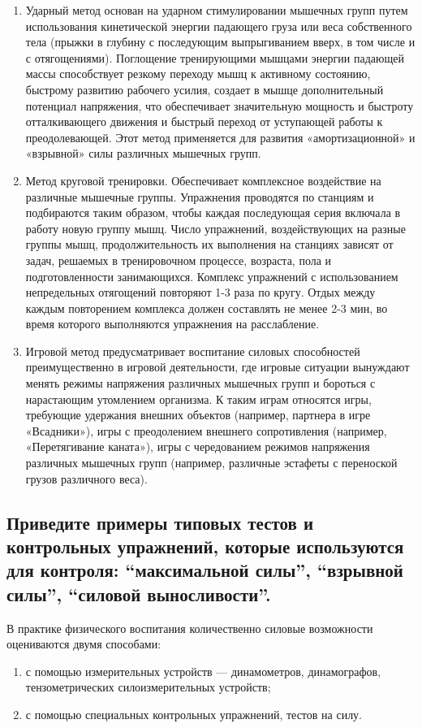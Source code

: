 \begin{enumerate}
    \item Ударный метод основан на ударном стимулировании мышечных групп путем использования кинетической энергии падающего груза или веса собственного тела (прыжки в глубину с последующим выпрыгиванием вверх, в том числе и с отягощениями). Поглощение тренирующими мышцами энергии падающей массы способствует резкому переходу мышц к активному состоянию, быстрому развитию рабочего усилия, создает в мышце дополнительный потенциал напряжения, что обеспечивает значительную мощность и быстроту отталкивающего движения и быстрый переход от уступающей работы к преодолевающей. Этот метод применяется для развития «амортизационной» и «взрывной» силы различных мышечных групп.
    \item Метод круговой тренировки. Обеспечивает комплексное воздействие на различные мышечные группы. Упражнения проводятся по станциям и подбираются таким образом, чтобы каждая последующая серия включала в работу новую группу мышц. Число упражнений, воздействующих на разные группы мышц, продолжительность их выполнения на станциях зависят от задач, решаемых в тренировочном процессе, возраста, пола и подготовленности занимающихся. Комплекс упражнений с использованием непредельных отягощений повторяют 1-3 раза по кругу. Отдых между каждым повторением комплекса должен составлять не менее 2-3 мин, во время которого выполняются упражнения на расслабление.
    \item Игровой метод предусматривает воспитание силовых способностей преимущественно в игровой деятельности, где игровые ситуации вынуждают менять режимы напряжения различных мышечных групп и бороться с нарастающим утомлением организма. К таким играм относятся игры, требующие удержания внешних объектов (например, партнера в игре «Всадники»), игры с преодолением внешнего сопротивления (например, «Перетягивание каната»), игры с чередованием режимов напряжения различных мышечных групп (например, различные эстафеты с переноской грузов различного веса).
\end{enumerate}


\subsection{Приведите примеры типовых тестов и контрольных упражнений, которые используются для контроля: ``максимальной силы'', ``взрывной силы'', ``силовой выносливости''.}

В практике физического воспитания количественно силовые возможности оцениваются двумя способами:
\begin{enumerate}
    \item с помощью измерительных устройств — динамометров, динамографов, тензометрических силоизмерительных устройств;
    \item с помощью специальных контрольных упражнений, тестов на силу.
\end{enumerate}


